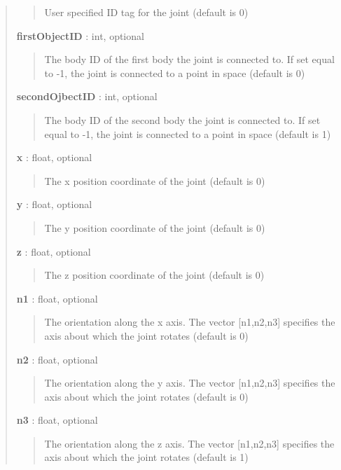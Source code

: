 \documentclass[letterpaper,10pt,english]{sphinxmanual}
\begin{document}
\begin{fulllineitems}
\begin{fulllineitems}
\begin{quote}
\begin{description}
\begin{quote}
User specified  ID tag for the joint (default is 0)
\end{quote}

\textbf{firstObjectID} : int, optional
\begin{quote}

The body ID of the first body the joint is connected to.
If set equal to -1, the joint is connected to a point in
space (default is 0)
\end{quote}

\textbf{secondOjbectID} : int, optional
\begin{quote}

The body ID of the second body the joint is connected to.
If set equal to -1, the joint is connected to a point in
space (default is 1)
\end{quote}

\textbf{x} : float, optional
\begin{quote}

The x position coordinate of the joint (default is 0)
\end{quote}

\textbf{y} : float, optional
\begin{quote}

The y position coordinate of the joint (default is 0)
\end{quote}

\textbf{z} : float, optional
\begin{quote}

The z position coordinate of the joint (default is 0)
\end{quote}

\textbf{n1} : float, optional
\begin{quote}

The orientation along the x axis. The vector {[}n1,n2,n3{]}
specifies the axis about which the joint rotates
(default is 0)
\end{quote}

\textbf{n2} : float, optional
\begin{quote}

The orientation along the y axis. The vector {[}n1,n2,n3{]}
specifies the axis about which the joint rotates
(default is 0)
\end{quote}

\textbf{n3} : float, optional
\begin{quote}

The orientation along the z axis. The vector {[}n1,n2,n3{]}
specifies the axis about which the joint rotates
(default is 1)
\end{quote}


\end{description}
\end{quote}
\end{fulllineitems}
\end{fulllineitems}
\end{document}
